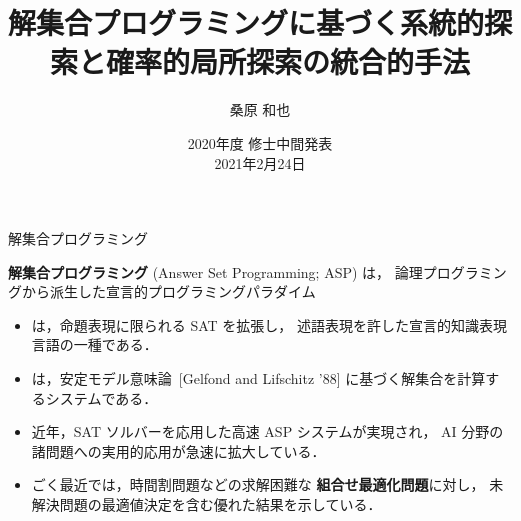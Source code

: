 \documentclass[11pt,dvipdfmx]{beamer}
\title{解集合プログラミングに基づく系統的探索と確率的局所探索の統合的手法}
\author{桑原 和也}
\date{2020年度 修士中間発表\\2021年2月24日}
\institute{番原研究室}
\begin{document}
\maketitle
\begin{frame}{解集合プログラミング}
  \begin{alertblock}{}\centering
    \alert{\bf 解集合プログラミング} (Answer Set Programming; ASP) は，
    論理プログラミングから派生した宣言的プログラミングパラダイム
  \end{alertblock}
  \bigskip
  \begin{itemize}
  \item {}は，命題表現に限られる SAT を拡張し，
    述語表現を許した宣言的知識表現言語の一種である．
  \item {}は，安定モデル意味論~[Gelfond and Lifschitz '88]
    に基づく解集合を計算するシステムである．
  \item 近年，SAT ソルバーを応用した高速 ASP システムが実現され，
    AI 分野の諸問題への実用的応用が急速に拡大している．
  \item ごく最近では，時間割問題などの求解困難な
    \alert{\bf 組合せ最適化問題}に対し，
    未解決問題の最適値決定を含む優れた結果を示している．
  \end{itemize}
\end{frame}
\end{document}
